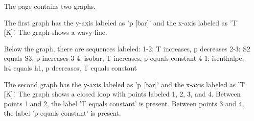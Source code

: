 The page contains two graphs.

The first graph has the y-axis labeled as 'p [bar]' and the x-axis labeled as 'T [K]'. The graph shows a wavy line.

Below the graph, there are sequences labeled:
1-2: T increases, p decreases
2-3: S2 equals S3, p increases
3-4: isobar, T increases, p equals constant
4-1: isenthalpe, h4 equals h1, p decreases, T equals constant

The second graph has the y-axis labeled as 'p [bar]' and the x-axis labeled as 'T [K]'. The graph shows a closed loop with points labeled 1, 2, 3, and 4. Between points 1 and 2, the label 'T equals constant' is present. Between points 3 and 4, the label 'p equals constant' is present.